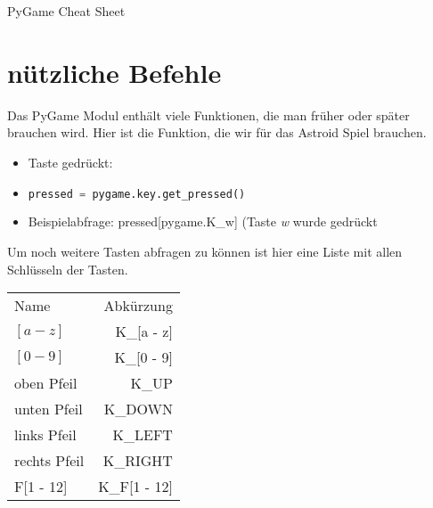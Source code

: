 \documentclass{article}
\begin{document}
	\begin{center}
		{\huge PyGame Cheat Sheet}
	\end{center}

	\section{nützliche Befehle}
		Das PyGame Modul enthält viele Funktionen, die man früher oder später brauchen wird. Hier ist die Funktion, die wir für das Astroid Spiel brauchen.\\
		\begin{itemize}
			\item Taste gedrückt:
			\item \begin{lstlisting}[language=Python]
pressed = pygame.key.get_pressed()
		\end{lstlisting}
			\item Beispielabfrage: pressed[pygame.K\_w] (Taste \textit{w} wurde gedrückt
		\end{itemize}
		Um noch weitere Tasten abfragen zu können ist hier eine Liste mit allen Schlüsseln der Tasten.\\
		\begin{tabular}{l | r}
		Name & Abkürzung \\
		$[a - z]$ & K\_[a - z] \\
		$[0 - 9]$ & K\_[0 - 9] \\
		oben Pfeil & K\_UP \\
		unten Pfeil & K\_DOWN \\
		links Pfeil & K\_LEFT \\
		rechts Pfeil & K\_RIGHT \\
		F[1 - 12] & K\_F[1 - 12] \\
		\end{tabular}
\end{document}
